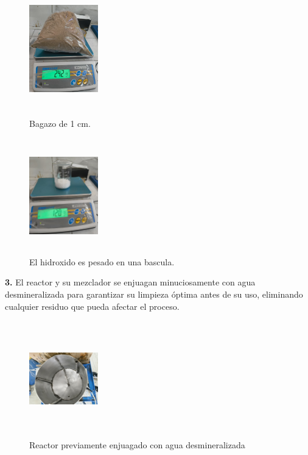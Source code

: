 \documentclass[12pt]{article}
\begin{document}
			
			\begin{figure}[H]
				\centering
				\begin{minipage}{0.46\textwidth}
					\centering
					\includegraphics[width=3cm, height=5cm]{imagenes/pesado4}
					\caption{Bagazo de 1 cm.}
					\label{bagazo1}
				\end{minipage}
				\hfill
				\begin{minipage}{0.48\textwidth}
					\centering
					\includegraphics[width=3cm, height=5cm]{imagenes/hidroxido_pesado}
					\caption{El hidroxido es pesado en una bascula.}
					\label{cernir_bagazo_hidroxidopesado}
				\end{minipage}
			\end{figure}
			
			
			
			\textbf{3.} El reactor y su mezclador se enjuagan minuciosamente con agua desmineralizada para garantizar su limpieza óptima antes de su uso, eliminando cualquier residuo que pueda afectar el proceso.
			\begin{figure} [H]
				\centering
				\includegraphics[width=3cm, height=5cm,angle=90]{imagenes/reactor limpio}
				\caption{Reactor previamente enjuagado con agua desmineralizada}
				\label{reactor limpio}
			\end{figure}
			
\end{document}
